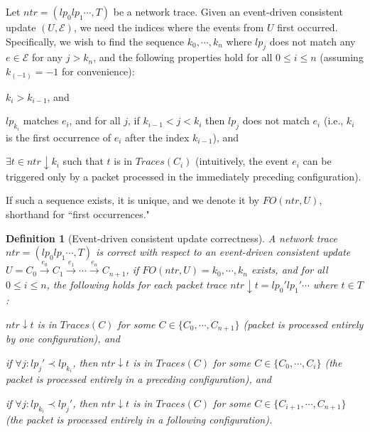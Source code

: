 \documentclass[pldi-cameraready]{sigplanconf}
\newcommand{\lpt}{\ensuremath{\mathit{lp}}}
\newcommand{\ntr}{\ensuremath{\mathit{ntr}}}
\newcommand{\PTraces}{\ensuremath{\mathit{Traces}}}
\newtheorem{definition}{Definition}
\begin{document}
Let $\ntr = (\lpt_0 \lpt_1 \cdots, T)$ be a network trace.   Given an event-driven consistent update 
$(U,\mathcal{E})$, 
we need the indices where the events from $U$ first
occurred. Specifically, we wish to find the 
sequence $k_0,\cdots,k_n$ where $\lpt_j$ does not match any $e\in\mathcal{E}$
for any $j > k_n$, and the
following properties hold for all $0 \leq i \leq n$ (assuming $k_{(-1)} = -1$ for
convenience): 
\begin{compactitem}
\item $k_i > k_{i-1}$, and
\item $\lpt_{k_i}$ matches $e_i$, and for all $j$, 
           if $k_{i-1} < j < k_i$ then $\lpt_{j}$ does not match $e_i$
           (i.e., $k_i$ is the first occurrence of $e_i$ after the
           index $k_{i-1}$), and
\item $\exists t \in \ntr{\downarrow}k_i$ such that $t$ is
in $\PTraces(C_{i})$ (intuitively, the event $e_i$ can be triggered only  by
a packet processed in the immediately preceding configuration). 
\end{compactitem}
If such a sequence exists, it is unique, and we denote it by $FO(\ntr,U)$, shorthand for ``first occurrences."

\begin{definition}[Event-driven consistent update correctness]
A network trace $\ntr=(\lpt_0 \lpt_1 \cdots, T)$ is {\em correct} with respect to an event-driven consistent
update $U = C_0 \xrightarrow{e_0} C_1 \xrightarrow{e_1} \cdots
\xrightarrow{e_{n}} C_{n+1}$,
if $FO(\ntr,U) = k_0,\cdots,k_n$ exists, and for all $0 \leq i \leq n$,
the following holds for each packet trace $\ntr{\downarrow}t  = \lpt_0' \lpt_1' \cdots$ where $t\in T$: 
\begin{compactitem}
\item
  $\ntr {\downarrow} t$ is in $\PTraces(C)$ for some $C\in\{C_0,\cdots,C_{n+1}\}$
  (packet is processed entirely by one configuration), and
\item if $\forall j : \lpt_j' \prec \lpt_{k_i}$, then 
  $\ntr  {\downarrow} t$ is in $\PTraces(C)$ for some $C\in\{C_0,\cdots,C_i\}$
  (the packet is processed entirely in a preceding configuration), and 
\item if $\forall j : \lpt_{k_i} \prec \lpt_j'$, then $\ntr
  {\downarrow} t$ is in $\PTraces(C)$ for some $C\in\{C_{i+1},\cdots,C_{n+1}\}$
  (the packet is
  processed entirely in a following configuration).
\end{compactitem}
\end{definition}
\end{document}
